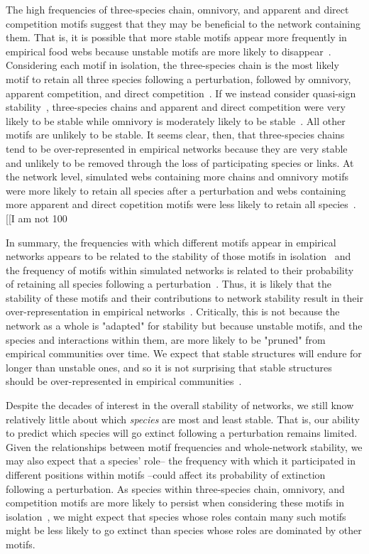 \documentclass[12pt]{article}
\begin{document}
	The high frequencies of three-species chain, omnivory, and apparent and direct competition motifs suggest that they may be beneficial to the network containing them. That is, it is possible that more stable motifs appear more frequently in empirical food webs because unstable motifs are more likely to disappear~\citep{Borrelli2015,Borrelli2015a}. Considering each motif in isolation, the three-species chain is the most likely motif to retain all three species following a perturbation, followed by omnivory, apparent competition, and direct competition~\citep{Stouffer2010b}. If we instead consider quasi-sign stability~\citep{Allesina2008}, three-species chains and apparent and direct competition were very likely to be stable while omnivory is moderately likely to be stable~\citep{Borrelli2015a}. All other motifs are unlikely to be stable. It seems clear, then, that three-species chains tend to be over-represented in empirical networks because they are very stable and unlikely to be removed through the loss of participating species or links. At the network level, simulated webs containing more chains and omnivory motifs were more likely to retain all species after a perturbation and webs containing more apparent and direct copetition motifs were less likely to retain all species~\citep{Stouffer2010b}. [[I am not 100%

	In summary, the frequencies with which different motifs appear in empirical networks appears to be related to the stability of those motifs in isolation~\citep{Stouffer2010b,Borrelli2015a} and the frequency of motifs within simulated networks is related to their probability of retaining all species following a perturbation~\citep{Stouffer2010b}. Thus, it is likely that the stability of these motifs and their contributions to network stability result in their over-representation in empirical networks~\citep{Borrelli2015}. Critically, this is not because the network as a whole is "adapted" for stability but because unstable motifs, and the species and interactions within them, are more likely to be "pruned" from empirical communities over time. We expect that stable structures will endure for longer than unstable ones, and so it is not surprising that stable structures should be over-represented in empirical communities~\citep{Borrelli2015}.

	Despite the decades of interest in the overall stability of networks, we still know relatively little about which \emph{species} are most and least stable. That is, our ability to predict which species will go extinct following a perturbation remains limited. Given the relationships between motif frequencies and whole-network stability, we may also expect that a species' role-- the frequency with which it participated in different positions within motifs --could affect its probability of extinction following a perturbation. As species within three-species chain, omnivory, and competition motifs are more likely to persist when considering these motifs in isolation~\citep{Stouffer2010b}, we might expect that species whose roles contain many such motifs might be less likely to go extinct than species whose roles are dominated by other motifs. 
\end{document}
